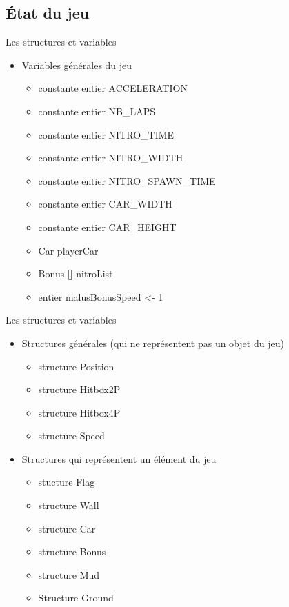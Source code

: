 \documentclass[10pt,dvipsnames,final]{beamer}
\begin{document}
\subsection{État du jeu}

\begin{frame}{Les structures et variables}
\begin{itemize}
\item Variables générales du jeu
\begin{itemize}
\item constante entier ACCELERATION
\item constante entier NB\_LAPS
\item constante entier NITRO\_TIME
\item constante entier NITRO\_WIDTH
\item constante entier NITRO\_SPAWN\_TIME
\item constante entier CAR\_WIDTH
\item constante entier CAR\_HEIGHT
\item Car playerCar
\item Bonus [] nitroList
\item entier malusBonusSpeed <- 1
\end{itemize}
\end{itemize}
\end{frame}


\begin{frame}{Les structures et variables}
\begin{itemize}
\item Structures générales (qui ne représentent pas un objet du jeu)
\begin{itemize}
\item structure Position
\item structure Hitbox2P
\item structure Hitbox4P
\item structure Speed
\end{itemize}
\item Structures qui représentent un élément du jeu
\begin{itemize}
\item stucture Flag
\item structure Wall
\item structure Car
\item structure Bonus
\item structure Mud
\item Structure Ground
\end{itemize}
\end{itemize}
\end{frame}
\end{document}
